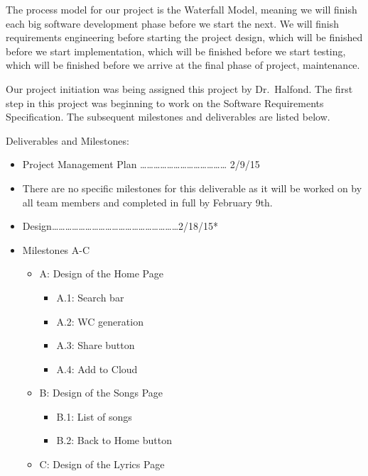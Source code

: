 \documentclass[]{article}
\begin{document}
The process model for our project is the Waterfall Model, meaning we
will finish each big software development phase before we start the
next. We will finish requirements engineering before starting the
project design, which will be finished before we start implementation,
which will be finished before we start testing, which will be finished
before we arrive at the final phase of project, maintenance.

Our project initiation was being assigned this project by Dr.~Halfond.
The first step in this project was beginning to work on the Software
Requirements Specification. The subsequent milestones and deliverables
are listed below.

Deliverables and Milestones:

\begin{itemize}
\itemsep1pt\parskip0pt
\item
  Project Management
  Plan
  \ldots{}\ldots{}\ldots{}\ldots{}\ldots{}\ldots{}\ldots{}\ldots{}\ldots{}\ldots{}\ldots{}\ldots{}\ldots{}
  2/9/15
\item
  There are no specific milestones for this deliverable as it will be
  worked on by all team members and completed in full by February 9th.
\item
  Design\ldots{}\ldots{}\ldots{}\ldots{}\ldots{}\ldots{}\ldots{}\ldots{}\ldots{}\ldots{}\ldots{}\ldots{}\ldots{}\ldots{}\ldots{}\ldots{}\ldots{}\ldots{}\ldots{}2/18/15*
\item
  Milestones A-C

  \begin{itemize}
  \itemsep1pt\parskip0pt
  \item
    A: Design of the Home Page

    \begin{itemize}
    \itemsep1pt\parskip0pt
    \item
      A.1: Search bar
    \item
      A.2: WC generation
    \item
      A.3: Share button
    \item
      A.4: Add to Cloud
    \end{itemize}
  \item
    B: Design of the Songs Page

    \begin{itemize}
    \itemsep1pt\parskip0pt
    \item
      B.1: List of songs
    \item
      B.2: Back to Home button
    \end{itemize}
  \item
    C: Design of the Lyrics Page


\end{itemize}
\end{itemize}
\end{document}
